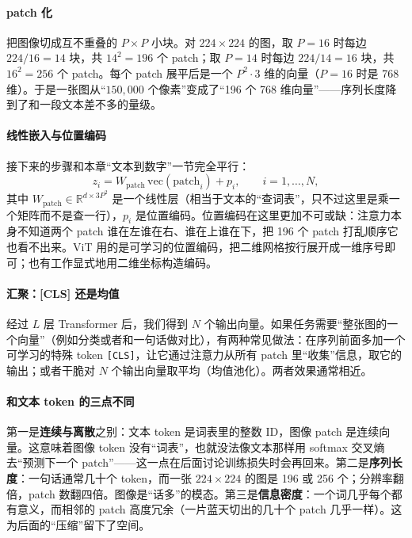 \paragraph{patch 化}

把图像切成互不重叠的 $P \times P$ 小块。对 $224 \times 224$ 的图，取 $P = 16$ 时每边 $224/16 = 14$ 块，共 $14^2 = 196$ 个 patch；取 $P = 14$ 时每边 $224/14 = 16$ 块，共 $16^2 = 256$ 个 patch。每个 patch 展平后是一个 $P^2 \cdot 3$ 维的向量（$P = 16$ 时是 768 维）。于是一张图从“$150{,}000$ 个像素”变成了“196 个 768 维向量”——序列长度降到了和一段文本差不多的量级。

\paragraph{线性嵌入与位置编码}

接下来的步骤和本章“文本到数字”一节完全平行：
\begin{equation}
    z_i = W_{\text{patch}}\, \mathrm{vec}(\text{patch}_i) + p_i, \qquad i = 1, \dots, N,
\end{equation}
其中 $W_{\text{patch}} \in \mathbb{R}^{d \times 3P^2}$ 是一个线性层（相当于文本的“查词表”，只不过这里是乘一个矩阵而不是查一行），$p_i$ 是位置编码。位置编码在这里更加不可或缺：注意力本身不知道两个 patch 谁在左谁在右、谁在上谁在下，把 196 个 patch 打乱顺序它也看不出来。ViT 用的是可学习的位置编码，把二维网格按行展开成一维序号即可；也有工作显式地用二维坐标构造编码。

\paragraph{汇聚：[CLS] 还是均值}

经过 $L$ 层 Transformer 后，我们得到 $N$ 个输出向量。如果任务需要“整张图的一个向量”（例如分类或者和一句话做对比），有两种常见做法：在序列前面多加一个可学习的特殊 token \texttt{[CLS]}，让它通过注意力从所有 patch 里“收集”信息，取它的输出；或者干脆对 $N$ 个输出向量取平均（均值池化）。两者效果通常相近。

\paragraph{和文本 token 的三点不同}

第一是\textbf{连续与离散}之别：文本 token 是词表里的整数 ID，图像 patch 是连续向量。这意味着图像 token 没有“词表”，也就没法像文本那样用 softmax 交叉熵去“预测下一个 patch”——这一点在后面讨论训练损失时会再回来。第二是\textbf{序列长度}：一句话通常几十个 token，而一张 $224 \times 224$ 的图是 196 或 256 个；分辨率翻倍，patch 数翻四倍。图像是“话多”的模态。第三是\textbf{信息密度}：一个词几乎每个都有意义，而相邻的 patch 高度冗余（一片蓝天切出的几十个 patch 几乎一样）。这为后面的“压缩”留下了空间。

